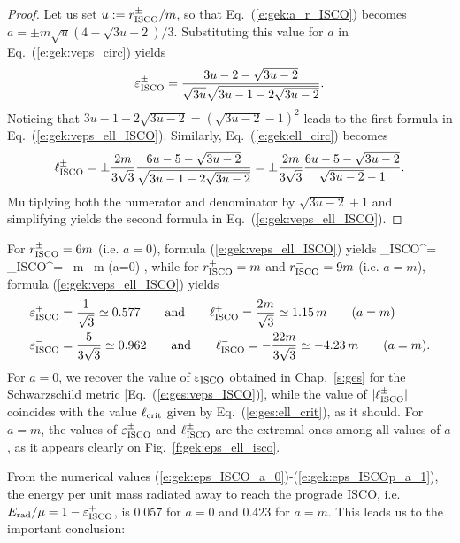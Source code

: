 \begin{proof}
Let us set $u := r_{\rm ISCO}^\pm/m$,
so that Eq.~(\ref{e:gek:a_r_ISCO}) becomes
$a = \pm m \sqrt{u}(4 - \sqrt{3u - 2})/3$.
Substituting this value for $a$ in Eq.~(\ref{e:gek:veps_circ}) yields
\[
    \varepsilon_{\rm ISCO}^\pm = \frac{3 u - 2 - \sqrt{3 u - 2}}{\sqrt{3u}\sqrt{3u-1 - 2\sqrt{3u - 2}}} .
\]
Noticing that $3u-1 - 2\sqrt{3u - 2} = (\sqrt{3u - 2} - 1)^2$ leads to the first
formula in Eq.~(\ref{e:gek:veps_ell_ISCO}).
Similarly, Eq.~(\ref{e:gek:ell_circ}) becomes
\[
    \ell_{\rm ISCO}^\pm = \pm \frac{2m}{3\sqrt{3}}
        \frac{6u - 5 - \sqrt{3u - 2}}{\sqrt{3u-1 - 2\sqrt{3u - 2}}}
        =  \pm \frac{2m}{3\sqrt{3}} \frac{6u - 5 - \sqrt{3u - 2}}{\sqrt{3u - 2} - 1} .
\]
Multiplying both the numerator and denominator
by $\sqrt{3u - 2} + 1$ and simplifying yields the second formula in Eq.~(\ref{e:gek:veps_ell_ISCO}).
\end{proof}
For $r_{\rm ISCO}^\pm = 6 m$ (i.e. $a=0$), formula (\ref{e:gek:veps_ell_ISCO})
yields
\be \label{e:gek:eps_ISCO_a_0}
    \veps_{\rm ISCO}^\pm =  
    \qand
    \ell_{\rm ISCO}^\pm =  \, m \, m \qquad (a=0) ,
\ee
while for $r_{\rm ISCO}^+ = m$ and $r_{\rm ISCO}^- = 9m$ (i.e. $a=m$), formula
(\ref{e:gek:veps_ell_ISCO}) yields
\begin{subequations}
\begin{align}
    & \varepsilon_{\rm ISCO}^+ = \frac{1}{\sqrt{3}} \simeq 0.577
    \qquad\mbox{and}\qquad
    \ell_{\rm ISCO}^+ = \frac{2 m}{\sqrt{3}} \simeq 1.15 \, m \qquad (a=m) \label{e:gek:eps_ISCOp_a_1} \\
    & \varepsilon_{\rm ISCO}^- = \frac{5}{3\sqrt{3}} \simeq 0.962
    \qquad\mbox{and}\qquad
    \ell_{\rm ISCO}^- = -\frac{22 m}{3\sqrt{3}} \simeq - 4.23 \, m \qquad (a=m) .
\end{align}
\end{subequations}
For $a=0$, we recover the value of $\varepsilon_{\rm ISCO}$ obtained in
Chap.~\ref{s:ges} for the Schwarzschild metric [Eq.~(\ref{e:ges:veps_ISCO})],
while the value of $|\ell_{\rm ISCO}^\pm|$ coincides with the value
$\ell_{\rm crit}$ given by Eq.~(\ref{e:ges:ell_crit}), as it should.
For $a=m$, the values of $\varepsilon_{\rm ISCO}^\pm$ and
$\ell_{\rm ISCO}^\pm$ are the extremal ones among all values of $a$,
as it appears clearly on Fig.~\ref{f:gek:eps_ell_isco}.

From the numerical values (\ref{e:gek:eps_ISCO_a_0})-(\ref{e:gek:eps_ISCOp_a_1}),
the energy per unit mass radiated away to reach the prograde ISCO,
i.e. $E_{\rm rad}/\mu = 1 - \varepsilon_{\rm ISCO}^+$, is $0.057$ for $a=0$
and $0.423$ for $a=m$. This leads us to the important conclusion:


